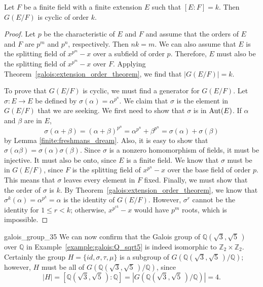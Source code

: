  
\begin{corollary}
Let $F$ be a finite field with a finite extension $E$ such that $[E:F]=k$. Then $G(E/F)$ is cyclic of order $k$.
\end{corollary}

\begin{proof}
Let $p$ be the characteristic of $E$ and $F$ and assume that the orders of $E$ and $F$ are $p^m$ and $p^n$, respectively.  Then $nk = m$.  We can also assume that $E$ is the splitting field of $x^{p^m} - x$
over a subfield of order $p$.  Therefore, $E$ must also be the splitting field of $x^{p^m} - x$ over $F$.  Applying Theorem~\ref{galois:extension_order_theorem}, we find that $|G(E/F)| = k$.     

To prove that $G(E/F)$ is cyclic, we must find a generator for $G(E/F)$.  Let $\sigma : E \rightarrow E$ be defined by $\sigma(\alpha) = \alpha^{p^n}$.  We claim that $\sigma$ is the element in $G(E/F)$ that
we are seeking.  We first need to show that $\sigma$ is in $\operatorname{Aut}(E)$.  If $\alpha$ and $\beta$ are in $E$,   
\[
\sigma(\alpha + \beta) = (\alpha + \beta)^{p^n}
= \alpha^{p^n} + \beta^{p^n} = \sigma(\alpha) + \sigma(\beta)
\]
by Lemma \ref{finite:freshmans_dream}.  Also, it is easy to show that $\sigma(\alpha \beta) = \sigma( \alpha ) \sigma( \beta )$. Since $\sigma$ is a nonzero homomorphism of fields, it must be injective.  It must also be onto, since $E$ is a finite field.  We know that $\sigma$ must be in $G(E/F)$, since $F$ is the splitting field of $x^{p^n} - x$ over the base field of order $p$. This means that $\sigma$ leaves every element in $F$ fixed.  Finally, we must show that the order of $\sigma$ is $k$. By Theorem~\ref{galois:extension_order_theorem}, we know that $\sigma^k( \alpha ) = \alpha^{p^k} = \alpha$ is the identity of $G( E/F)$.  However, $\sigma^r$ cannot be the identity for $1 \leq r < k$; otherwise, $x^{p^{rk}} - x$ would have $p^m$ roots, which is impossible. 
\end{proof}
 

\begin{example}{galois_group_35}
We can now confirm that the Galois group of ${\mathbb Q}( \sqrt{3},
\sqrt{5}\, )$ over ${\mathbb Q}$ in Example~\ref{example:galois:Q_sqrt5} is indeed isomorphic to
${\mathbb Z}_2 \times {\mathbb Z}_2$.  Certainly the group $H = \{ id,
\sigma, \tau, \mu \}$ is a subgroup of $G({\mathbb Q}( \sqrt{3}, \sqrt{5}\,
)/{\mathbb Q})$; however,  $H$ must be all of $G({\mathbb Q}( \sqrt{3},
\sqrt{5}\, )/{\mathbb Q})$, since  
\[
|H| = [{\mathbb Q}( \sqrt{3}, \sqrt{5}\, ):{\mathbb Q}] = |G({\mathbb Q}(
\sqrt{3}, \sqrt{5}\, )/{\mathbb Q})| = 4.
\]
\end{example}
 

